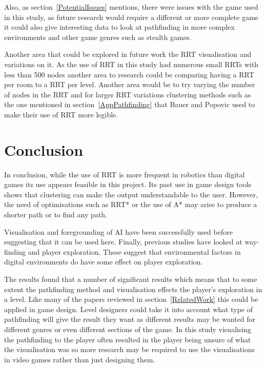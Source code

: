 \documentclass[journal]{IEEEtran}
\begin{document}
	Also, as section~\ref{PotentialIssues} mentions, there were issues with the game used in this study, as future research would require a different or more complete game it could also give interesting data to look at pathfinding in more complex environments and other game genres such as stealth games. 
	
	Another area that could be explored in future work the RRT visualisation and variations on it. As the use of RRT in this study had numerous small RRTs with less than 500 nodes another area to research could be comparing having a RRT per room to a RRT per level. Another area would be to try varying the number of nodes in the RRT and for larger RRT variations clustering methods such as the one mentioned in section~\ref{AppPathfinding} that Bauer and Popovic used to make their use of RRT more legible.
	
	\section{Conclusion} 
	In conclusion, while the use of RRT is more frequent in robotics than digital games its use appears feasible in this project. Its past use in game design tools shows that clustering can make the output understandable to the user. However, the need of optimisations such as RRT* or the use of A* may arise to produce a shorter path or to find any path. 
	
	Visualisation and foregrounding of AI have been successfully used before suggesting that it can be used here. Finally, previous studies have looked at way-finding and player exploration. These suggest that environmental factors in digital environments do have some effect on player exploration.
	
	The results found that a number of significant results which means that to some extent the pathfinding method and visualisation effects the player's exploration in a level.  Like many of the papers reviewed in section~\ref{RelatedWork} this could be applied in game design. Level designers could take it into account what type of pathfinding will give the result they want as different results may be wanted for different genres or even different sections of the game. In this study visualising the pathfinding to the player often resulted in the player being unsure of what the visualisation was so more research may be required to use the visualisations in video games rather than just designing them.
	
	
	
	
\end{document}
